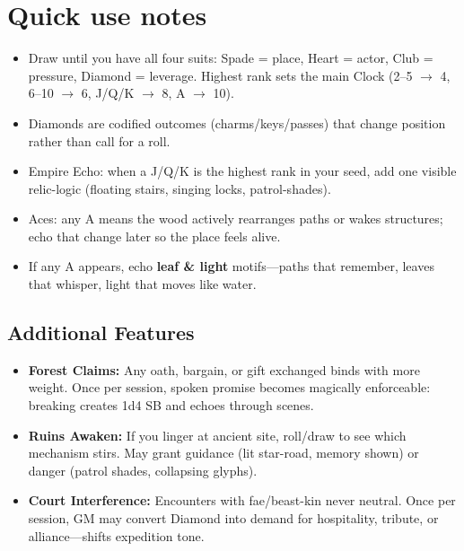 \section*{Quick use notes}
\label{sec:valewood-quick-use}
\begin{itemize}
\item Draw until you have all four suits: Spade = place, Heart = actor, Club = pressure, Diamond = leverage. Highest rank sets the main Clock (2--5 $\rightarrow$ 4, 6--10 $\rightarrow$ 6, J/Q/K $\rightarrow$ 8, A $\rightarrow$ 10).
\item Diamonds are codified outcomes (charms/keys/passes) that change position rather than call for a roll.
\item Empire Echo: when a J/Q/K is the highest rank in your seed, add one visible relic-logic (floating stairs, singing locks, patrol-shades).
\item Aces: any A means the wood actively rearranges paths or wakes structures; echo that change later so the place feels alive.
\item If any A appears, echo \textbf{leaf \& light} motifs---paths that remember, leaves that whisper, light that moves like water.
\end{itemize}

\subsection*{Additional Features}
\begin{itemize}
\item \textbf{Forest Claims:} Any oath, bargain, or gift exchanged binds with more weight. Once per session, spoken promise becomes magically enforceable: breaking creates 1d4 SB and echoes through scenes.
\item \textbf{Ruins Awaken:} If you linger at ancient site, roll/draw to see which mechanism stirs. May grant guidance (lit star-road, memory shown) or danger (patrol shades, collapsing glyphs).
\item \textbf{Court Interference:} Encounters with fae/beast-kin never neutral. Once per session, GM may convert Diamond into demand for hospitality, tribute, or alliance---shifts expedition tone.
\end{itemize}


